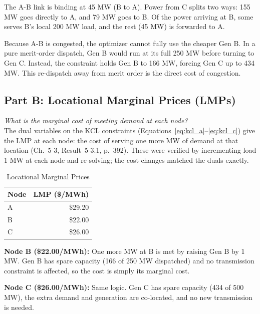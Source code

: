 \documentclass[journal, onecolumn, 12pt]{IEEEtran}
\begin{document}
The A-B link is binding at 45 MW (B to A). Power from C splits two ways: 155 MW goes directly to A, and 79 MW goes to B. Of the power arriving at B, some serves B's local 200 MW load, and the rest (45 MW) is forwarded to A. \par

Because A-B is congested, the optimizer cannot fully use the cheaper Gen B. In a pure merit-order dispatch, Gen B would run at its full 250 MW before turning to Gen C. Instead, the constraint holds Gen B to 166 MW, forcing Gen C up to 434 MW. This re-dispatch away from merit order is the direct cost of congestion.

\subsection{Part B: Locational Marginal Prices (LMPs)}
\textit{What is the marginal cost of meeting demand at each node?}\\

The dual variables on the KCL constraints (Equations~\ref{eq:kcl_a}--\ref{eq:kcl_c}) give the LMP at each node: the cost of serving one more MW of demand at that location \cite{stoft2002} (Ch.~5-3, Result~5-3.1, p.~392). These were verified by incrementing load 1 MW at each node and re-solving; the cost changes matched the duals exactly.

\begin{table}[h]
    \centering
    \caption{Locational Marginal Prices}
    \label{tab:lmps}
    \begin{tabular}{@{}lr@{}}
    \toprule
    \textbf{Node} & \textbf{LMP (\$/MWh)} \\ \midrule
    A & \cellcolor{myred} \$29.20 \\
    B & \cellcolor{mygreen} \$22.00 \\
    C & \cellcolor{myyellow} \$26.00 \\
    \bottomrule
    \end{tabular}
\end{table}

\textbf{Node B (\$22.00/MWh):} One more MW at B is met by raising Gen B by 1 MW. Gen B has spare capacity (166 of 250 MW dispatched) and no transmission constraint is affected, so the cost is simply its marginal cost. \par

\textbf{Node C (\$26.00/MWh):} Same logic. Gen C has spare capacity (434 of 500 MW), the extra demand and generation are co-located, and no new transmission is needed. \par
\end{document}
